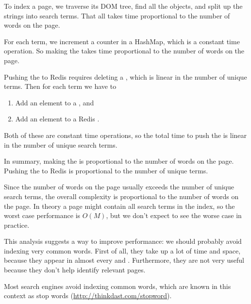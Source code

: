 \documentclass[12pt]{book}
\theoremstyle{exercise}
\begin{document}
To index a page, we traverse its DOM tree, find all the
 objects, and split up the strings into search terms.
That all takes time proportional to the number of words on the page.


For each term, we increment a counter in a HashMap, which is a constant
time operation. So making the  takes time
proportional to the number of words on the page.


Pushing the  to Redis requires deleting a
, which is linear in the number of unique terms.
Then for each term we have to

\begin{enumerate}

\item
  Add an element to a , and

\item
  Add an element to a Redis .

\end{enumerate}

Both of these are constant time operations, so the total time to push
the  is linear in the number of unique search terms.


In summary, making the  is proportional to the
number of words on the page. Pushing the  to Redis
is proportional to the number of unique terms.


Since the number of words on the page usually exceeds the number of
unique search terms, the overall complexity is proportional to the
number of words on the page. In theory a page might contain all search
terms in the index, so the worst case performance is $O(M)$, but we don't
expect to see the worse case in practice.

This analysis suggests a way to improve performance: we should probably
avoid indexing very common words. First of all, they take up a lot of
time and space, because they appear in almost every  and
. Furthermore, they are not very useful because they
don't help identify relevant pages.


Most search engines avoid indexing common words, which are known in this
context as stop words (\url{http://thinkdast.com/stopword}).
\end{document}
